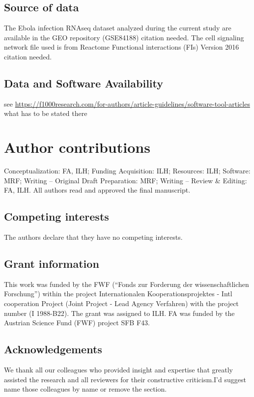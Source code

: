 \documentclass[10pt,a4paper,twocolumn]{article}
\newcommand{\TODO}[1]{\begingroup\color{red}#1\endgroup}
\begin{document}
\subsection*{Source of data}

The Ebola infection RNAseq dataset analyzed during the current study
are available in the GEO repository (GSE84188) \TODO{citation
  needed}. The cell signaling network file used is from Reactome
Functional interactions (FIs) Version 2016 \TODO{citation needed}.

\subsection*{Data and Software Availability}

\TODO{see
  \url{https://f1000research.com/for-authors/article-guidelines/software-tool-articles}
  what has to be stated there}

\section*{Author contributions}
Conceptualization: FA, ILH; Funding Acquisition: ILH; Resources: ILH;
Software: MRF; Writing – Original Draft Preparation: MRF; Writing –
Review \& Editing: FA, ILH. All authors read and approved the final
manuscript.

\subsection*{Competing interests}

The authors declare that they have no competing interests.


\subsection*{Grant information}

This work was funded by the FWF (“Fonds zur Forderung der
wissenschaftlichen Forschung”) within the project Internationalen
Kooperationsprojektes - Intl cooperation Project (Joint Project - Lead
Agency Verfahren) with the project number (I 1988-B22). The grant was
assigned to ILH. FA was funded by the Austrian Science Fund (FWF)
project SFB F43.


\subsection*{Acknowledgements}


We thank all our colleagues who provided insight and expertise that
greatly assisted the research and all reviewers for their constructive
criticism.\TODO{I'd suggest name those colleagues by name or remove
  the section.}
\end{document}
